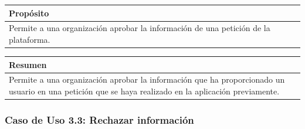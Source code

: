 \newpage

\begin{table}[H]
    \centering
    \begin{tabularx}{\textwidth}{@{} |L |@{}} \hline
        \textbf{Propósito} \\
        \hline
        Permite a una organización aprobar la información de una petición de la plataforma. \\
        \hline
    \end{tabularx}
\end{table}

\begin{table}[H]
    \centering
    \begin{tabularx}{\textwidth}{@{} |L |@{}} \hline
        \textbf{Resumen} \\
        \hline
        Permite a una organización aprobar la información que ha proporcionado un usuario en una petición que se haya
    realizado en la aplicación previamente. \\
        \hline
    \end{tabularx}
\end{table}

\subsubsection{Caso de Uso 3.3: Rechazar información}\label{subsubsec:rechazar-informacion}

